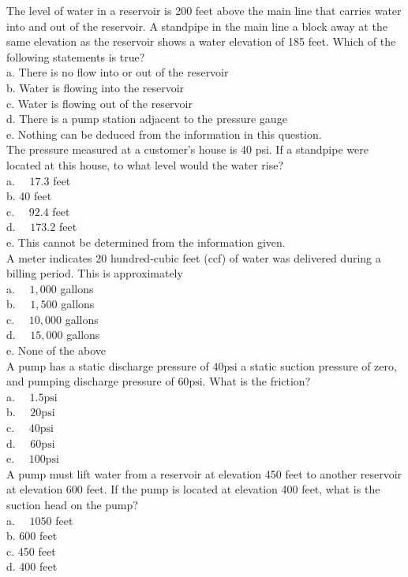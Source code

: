 The level of water in a reservoir is 200 feet above the main line that carries water into and out of the reservoir. A standpipe in the main line a block away at the same elevation as the reservoir shows a water elevation of 185 feet. Which of the following statements is true?\\
a. There is no flow into or out of the reservoir\\
b. Water is flowing into the reservoir\\
c. Water is flowing out of the reservoir\\
d. There is a pump station adjacent to the pressure gauge\\
e. Nothing can be deduced from the information in this question.\\

The pressure measured at a customer's house is 40 psi. If a standpipe were located at this house, to what level would the water rise?\\
a. $\quad 17.3$ feet\\
b. 40 feet\\
c. $\quad 92.4$ feet\\
d. $\quad 173.2$ feet\\
e. This cannot be determined from the information given.\\

A meter indicates 20 hundred-cubic feet (ccf) of water was delivered during a billing period. This is approximately\\
a. $\quad 1,000$ gallons\\
b. $\quad 1,500$ gallons\\
c. $\quad 10,000$ gallons\\
d. $\quad 15,000$ gallons\\
e. None of the above\\

A pump has a static discharge pressure of $40 \mathrm{psi}$ a static suction pressure of zero, and pumping discharge pressure of $60 \mathrm{psi}$. What is the friction?\\
a. $\quad 1.5 \mathrm{psi}$\\
b. $\quad 20 \mathrm{psi}$\\
c. $\quad 40 \mathrm{psi}$\\
d. $\quad 60 \mathrm{psi}$\\
e. $\quad 100 \mathrm{psi}$\\

A pump must lift water from a reservoir at elevation 450 feet to another reservoir at elevation 600 feet. If the pump is located at elevation 400 feet, what is the suction head on the pump?\\
a. $\quad 1050$ feet\\
b. 600 feet\\
c. 450 feet\\
d. 400 feet\\



